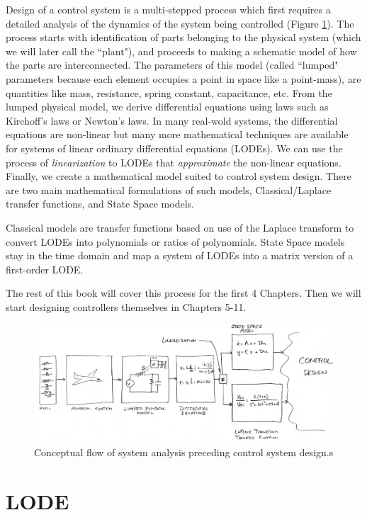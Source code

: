Design of a control system is a multi-stepped process which first requires a detailed analysis of the dynamics of 
the system being controlled (Figure \ref{fig_control_design_flow}).  The process starts with identification of parts belonging
to the physical system (which we will later call the ``plant"), and proceeds to making a schematic model of
how the parts are interconnected.   The parameters of this model (called ``lumped" parameters because each element 
occupies a point in space like a point-mass), are quantities like mass, resistance, spring constant, capacitance, etc. 
From the lumped physical model, we derive differential equations using laws such as Kirchoff's laws or Newton's laws.  
In many real-wold systems, the differential equations are non-linear but many more mathematical techniques are available
for systems of linear ordinary differential equations (LODEs).  We can use the process of {\it linearization} to LODEs
that {\it approximate} the non-linear equations.    Finally, we create a mathematical model suited to control system design. 
There are two main mathematical formulations of such models, Classical/Laplace transfer functions, and State Space models. 

Classical models are transfer functions based on use of the Laplace transform to convert LODEs into polynomials or ratios 
of polynomials.   State Space models stay in the time domain and map a system of LODEs into a matrix version of a first-order 
LODE. 

The rest of this book will cover this process for the first 4 Chapters.  Then we will start designing controllers themselves 
in Chapters 5-11.

\begin{figure}\centering
\includegraphics[width=6.45in]{figs01/01115.png}
\caption{Conceptual flow of system analysis preceding control system design.s}\label{fig_control_design_flow}
\end{figure}


\section{LODE}
